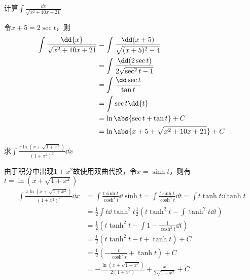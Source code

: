 \begin{example}
    计算$\displaystyle\int\frac{\dd{x}}{\sqrt{x^2+10x+21}}$
\end{example}
\begin{solution}
    令$x+5=2\sec t$，则
    \begin{align*}
        \int\frac{\dd{x}}{\sqrt{x^2+10x+21}} & = \int\frac{\dd(x+5)}{\sqrt{(x+5)^2-4}}        \\
                                             & = \int\frac{\dd(2\sec t)}{2\sqrt{\sec^2 t -1}} \\
                                             & = \int\frac{\dd\sec t}{\tan t}                 \\
                                             & = \int\sec t\dd{t}                             \\
                                             & = \ln\abs{\sec t+\tan t} +C                    \\
                                             & = \ln\abs{x+5+\sqrt{x^2+10x+21}} +C
    \end{align*}
\end{solution}

\begin{example}
    求$\displaystyle\int \frac{x\ln\left(x+\sqrt{1+x^2}\right)}{(1+x^2)^2}\dd{x}$
\end{example}
\begin{solution}
    由于积分中出现$1+x^2$故使用双曲代换，令$x = \sinh t$，则有$t = \ln(x+\sqrt{1+x^2})$
    \begin{align*}
        \int \frac{x\ln\left(x+\sqrt{1+x^2}\right)}{(1+x^2)^2}\dd{x}
         & = \int \frac{t\sinh t}{\cosh^4t}\dd{\sinh t}
        = \int \frac{t\sinh t}{\cosh^3t}\dd{t}
        = \int t\tanh t \dd{\tanh t}                                                 \\
         & = \frac{1}{2} \int t \dd{\tanh^2 t}
        \frac{1}{2} \left( t\tanh^2 t - \int \tanh^2 t\dd{t} \right)                 \\
         & = \frac{1}{2} \left( t\tanh^2 t - \int 1-\frac{1}{\cosh^2t}\dd{t} \right) \\
         & = \frac{1}{2} (t\tanh^2 t - t + \tanh t)+C                                \\
         & = \frac{1}{2} \left(-\frac{t}{\cosh^2 t} + \tanh t\right)+C               \\
         & =  -\frac{\ln(x+\sqrt{1+x^2})}{2(1+x^2)} + \frac{x}{2\sqrt{1+x^2}}+C      \\
    \end{align*}
\end{solution}

